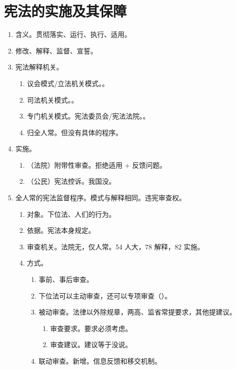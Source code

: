 \section{宪法的实施及其保障}
\begin{enumerate}
  \item 含义。贯彻落实、运行、执行、适用。
  \item 修改、解释、监督、宣誓。
  \item 宪法解释机关。
        \begin{enumerate}
          \item 议会模式/立法机关模式。。
          \item 司法机关模式。。
          \item 专门机关模式。宪法委员会/宪法法院。。
          \item 归全人常。但没有具体的程序。
        \end{enumerate}
  \item 实施。
        \begin{enumerate}
          \item （法院）附带性审查。拒绝适用 + 反馈问题。
          \item （公民）宪法控诉。我国没。
        \end{enumerate}
  \item 全人常的宪法监督程序。模式与解释相同。违宪审查权。
        \begin{enumerate}
          \item 对象。下位法、人们的行为。
          \item 依据。宪法本身规定。
          \item 审查机关。法院无，仅人常。54 人大，78 解释，82 实施。
          \item 方式。
                \begin{enumerate}
                  \item 事前、事后审查。
                  \item 下位法可以主动审查，还可以专项审查（）。
                  \item 被动审查。法律以外除规章，两高、监省常提要求，其他提建议。
                        \begin{enumerate}
                          \item 审查要求。要求必须考虑。
                          \item 审查建议。建议等于没说。
                        \end{enumerate}
                  \item 联动审查。新增。信息反馈和移交机制。

\end{enumerate}
\end{enumerate}
\end{enumerate}
